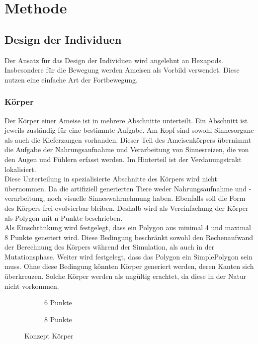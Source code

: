 %
%


\chapter{Methode}

  \section{Design der Individuen}

    Der Ansatz für das Design der Individuen wird angelehnt an \Glspl{Hexapod}.
    Insbesondere für die Bewegung werden Ameisen als Vorbild verwendet.
    Diese nutzen eine einfache Art der Fortbewegung.

    \subsection{Körper\label{sub:DesignBody}}

      Der Körper einer Ameise ist in mehrere Abschnitte unterteilt.
      Ein Abschnitt ist jeweils zuständig für eine bestimmte Aufgabe.
      Am Kopf sind sowohl Sinnesorgane als auch die Kieferzangen vorhanden.
      Dieser Teil des Ameisenkörpers übernimmt die Aufgabe der Nahrungsaufnahme und Verarbeitung von Sinnesreizen,
      die von den Augen und Fühlern erfasst werden.
      Im Hinterteil ist der Verdauungstrakt lokalisiert.
      \\
      Diese Unterteilung in spezialisierte Abschnitte des Körpers wird nicht übernommen.
      Da die artifiziell generierten Tiere weder Nahrungsaufnahme und -verarbeitung,
      noch visuelle Sinneswahrnehmung haben.
      Ebenfalls soll die Form des Körpers frei evolvierbar bleiben.
      Deshalb wird als Vereinfachung der Körper als Polygon mit n Punkte beschrieben.
      \\
      Als Einschränkung wird festgelegt, dass ein Polygon aus minimal 4 und maximal 8 Punkte generiert wird.
      Diese Bedingung beschränkt sowohl den Rechenaufwand der Berechnung des Körpers während der Simulation,
      als auch in der Mutationsphase.
      Weiter wird festgelegt, dass das Polygon ein \gls{SimplePolygon} sein muss.
      Ohne diese Bedingung könnten Körper generiert werden, deren Kanten sich überkreuzen.
      Solche Körper werden als ungültig erachtet, da diese in der Natur nicht vorkommen.

      \begin{figure}[H]
        \centering
        \begin{subfigure}[b]{0.3\textwidth}
          
          \caption{6 Punkte\label{fig:ConceptBodyPoints6}}
        \end{subfigure}
        \qquad
        \begin{subfigure}[b]{0.3\textwidth}
          
          \caption{8 Punkte\label{fig:ConceptBodyPoints8}}
        \end{subfigure}
        \caption{Konzept Körper\label{fig:ConceptBodyPoints}}
      \end{figure}

